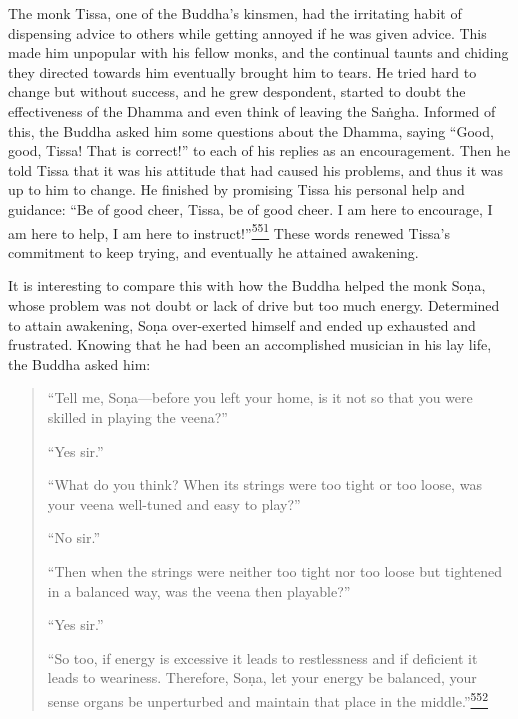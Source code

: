The monk Tissa, one of the Buddha's kinsmen, had the irritating habit of
dispensing advice to others while getting annoyed if he was given
advice. This made him unpopular with his fellow monks, and the continual
taunts and chiding they directed towards him eventually brought him to
tears. He tried hard to change but without success, and he grew
despondent, started to doubt the effectiveness of the Dhamma and even
think of leaving the Saṅgha. Informed of this, the Buddha asked him some
questions about the Dhamma, saying ``Good, good, Tissa! That is
correct!'' to each of his replies as an encouragement. Then he told
Tissa that it was his attitude that had caused his problems, and thus it
was up to him to change. He finished by promising Tissa his personal
help and guidance: ``Be of good cheer, Tissa, be of good cheer. I am
here to encourage, I am here to help, I am here to
instruct!''\label{footprints_split_014.html_fnref551}\hyperref[footprints_split_025.htmlux5cux23fn551]{\textsuperscript{551}}
These words renewed Tissa's commitment to keep trying, and eventually he
attained awakening.

It is interesting to compare this with how the Buddha helped the monk
Soṇa, whose problem was not doubt or lack of drive but too much energy.
Determined to attain awakening, Soṇa over-exerted himself and ended up
exhausted and frustrated. Knowing that he had been an accomplished
musician in his lay life, the Buddha asked him:

\begin{quote}
``Tell me, Soṇa---before you left your home, is it not so that you were
skilled in playing the veena?''

``Yes sir.''

``What do you think? When its strings were too tight or too loose, was
your veena well-tuned and easy to play?''

``No sir.''

``Then when the strings were neither too tight nor too loose but
tightened in a balanced way, was the veena then playable?''

``Yes sir.''

``So too, if energy is excessive it leads to restlessness and if
deficient it leads to weariness. Therefore, Soṇa, let your energy be
balanced, your sense organs be unperturbed and maintain that place in
the
middle.''\label{footprints_split_014.html_fnref552}\hyperref[footprints_split_025.htmlux5cux23fn552]{\textsuperscript{552}}
\end{quote}

